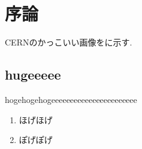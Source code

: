 \section{序論}
CERNのかっこいい画像をに示す.





\subsection{hugeeeee}
hogehogehogeeeeeeeeeeeeeeeeeeeeeee\cite{Osada:2019oor} \\


\begin{enumerate}
	\item ほげほげ
	\item ぽげぽげ
\end{enumerate}